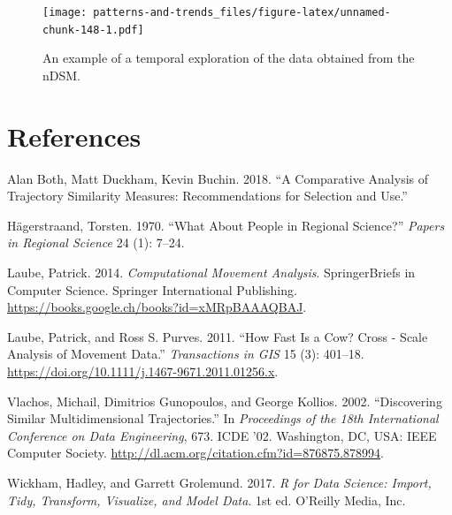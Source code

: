 \documentclass[]{book}
\begin{document}
\begin{figure}
\centering
\texttt{[image: patterns-and-trends\_files/figure-latex/unnamed-chunk-148-1.pdf]}
\caption{\label{fig:unnamed-chunk-148}An example of a temporal exploration of the data obtained from the nDSM.}
\end{figure}

\hypertarget{references}{%
\chapter*{References}\label{references}}

\hypertarget{refs}{}
\leavevmode\hypertarget{ref-both2018}{}%
Alan Both, Matt Duckham, Kevin Buchin. 2018. ``A Comparative Analysis of Trajectory Similarity Measures: Recommendations for Selection and Use.''

\leavevmode\hypertarget{ref-hagerstraand1970}{}%
Hägerstraand, Torsten. 1970. ``What About People in Regional Science?'' \emph{Papers in Regional Science} 24 (1): 7--24.

\leavevmode\hypertarget{ref-laube2014}{}%
Laube, Patrick. 2014. \emph{Computational Movement Analysis}. SpringerBriefs in Computer Science. Springer International Publishing. \url{https://books.google.ch/books?id=xMRpBAAAQBAJ}.

\leavevmode\hypertarget{ref-laube2011}{}%
Laube, Patrick, and Ross S. Purves. 2011. ``How Fast Is a Cow? Cross - Scale Analysis of Movement Data.'' \emph{Transactions in GIS} 15 (3): 401--18. \url{https://doi.org/10.1111/j.1467-9671.2011.01256.x}.

\leavevmode\hypertarget{ref-vlachos2002}{}%
Vlachos, Michail, Dimitrios Gunopoulos, and George Kollios. 2002. ``Discovering Similar Multidimensional Trajectories.'' In \emph{Proceedings of the 18th International Conference on Data Engineering}, 673. ICDE '02. Washington, DC, USA: IEEE Computer Society. \url{http://dl.acm.org/citation.cfm?id=876875.878994}.

\leavevmode\hypertarget{ref-wickham2017}{}%
Wickham, Hadley, and Garrett Grolemund. 2017. \emph{R for Data Science: Import, Tidy, Transform, Visualize, and Model Data}. 1st ed. O'Reilly Media, Inc.
\end{document}
